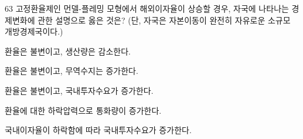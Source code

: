 \begin{question}{63}
고정환율제인 먼델-플레밍 모형에서 해외이자율이 상승할 경우, 자국에 나타나는 경제변화에 관한 설명으로 옳은 것은? (단, 자국은 자본이동이 완전히 자유로운 소규모 개방경제국이다.)
\begin{choices}
  \item 환율은 불변이고, 생산량은 감소한다.
  \item 환율은 불변이고, 무역수지는 증가한다.
  \item 환율은 불변이고, 국내투자수요가 증가한다.
  \item 환율에 대한 하락압력으로 통화량이 증가한다.
  \item 국내이자율이 하락함에 따라 국내투자수요가 증가한다.
\end{choices}
\end{question}
